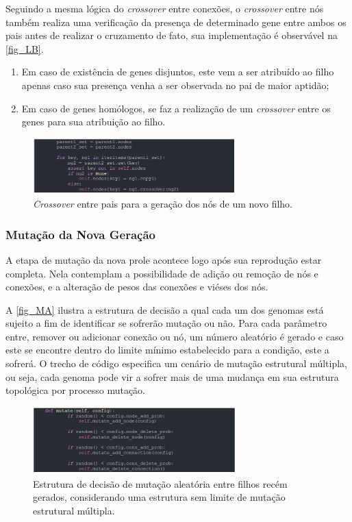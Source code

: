Seguindo a mesma lógica do \textit{crossover} entre conexões, o \textit{crossover} entre
nós também realiza uma verificação da presença de determinado gene entre ambos os pais antes
de realizar o cruzamento de fato, sua implementação é observável na \autoref{fig_LB}.

\begin{enumerate}
	\item Em caso de existência de genes disjuntos, este vem a ser atribuído ao filho apenas caso sua presença venha a  ser observada no pai de maior aptidão;
	\item Em caso de genes homólogos, se faz a realização de um \textit{crossover} entre os genes para sua atribuição ao filho.
\end{enumerate}

\begin{figure}[htb]
        \centering
        \caption{\label{fig_LB}\textit{Crossover} entre pais para a geração dos nós de um novo filho.}
        \includegraphics[width=0.7\textwidth]{images/LB.png}
\end{figure}

\subsubsection{Mutação da Nova Geração}
A etapa de mutação da nova prole acontece logo após sua reprodução estar completa. Nela contemplam a
possibilidade de adição ou remoção de nós e conexões, e a alteração de pesos das conexões e viéses dos nós.

A \autoref{fig_MA} ilustra a estrutura de decisão a qual cada um dos genomas está sujeito a fim de
identificar se sofrerão mutação ou não. Para cada parâmetro entre, remover ou adicionar conexão ou nó,
um número aleatório é gerado e caso este se encontre dentro do limite mínimo estabelecido para a condição,
este a sofrerá. O trecho de código especifica um cenário de mutação estrutural múltipla, ou seja,
cada genoma pode vir a sofrer mais de uma mudança em sua estrutura topológica por processo mutação.

\begin{figure}[htb]
        \centering
        \caption{\label{fig_MA}Estrutura de decisão de mutação aleatória entre filhos recém gerados, considerando uma estrutura sem limite de mutação estrutural múltipla.}
        \includegraphics[width=0.7\textwidth]{images/MA.png}
\end{figure}

